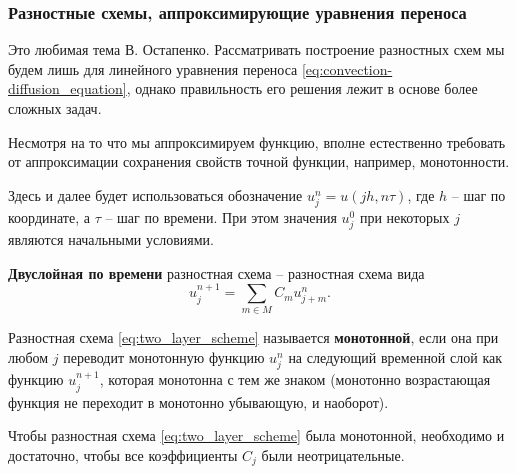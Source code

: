 \documentclass[../main.tex]{subfile}
\begin{document}
\subsubsection{Разностные схемы, аппроксимирующие уравнения переноса}
Это любимая тема В. Остапенко. Рассматривать построение разностных схем
мы будем лишь для линейного уравнения переноса
\eqref{eq:convection-diffusion_equation}, однако правильность его решения лежит
в основе более сложных задач.

Несмотря на то что мы аппроксимируем функцию, вполне естественно требовать от
аппроксимации сохранения свойств точной функции, например, монотонности.

Здесь и далее будет использоваться обозначение $u_j^n=u(jh,n\tau)$, где $h$ --
шаг по координате, а $\tau$ -- шаг по времени. При этом значения $u^0_j$ при
некоторых $j$ являются начальными условиями.

\begin{define}\label{eq:two_layer_scheme}
	\textbf{Двуслойная по времени} разностная схема -- разностная схема вида
	\[u_j^{n+1}=\sum_{m\in M}C_mu_{j+m}^n.\]
\end{define}

\begin{define}
	Разностная схема \eqref{eq:two_layer_scheme} называется
	\textbf{монотонной}, если она при любом $j$ переводит монотонную функцию
	$u_j^n$ на следующий временной слой как функцию $u_j^{n+1}$, которая
	монотонна с тем же знаком (монотонно возрастающая функция не переходит в
	монотонно убывающую, и наоборот).
\end{define}

\begin{theorem}
	Чтобы разностная схема \eqref{eq:two_layer_scheme} была монотонной,
	необходимо и достаточно, чтобы все коэффициенты $C_j$ были
	неотрицательные.
\end{theorem}
\end{document}
